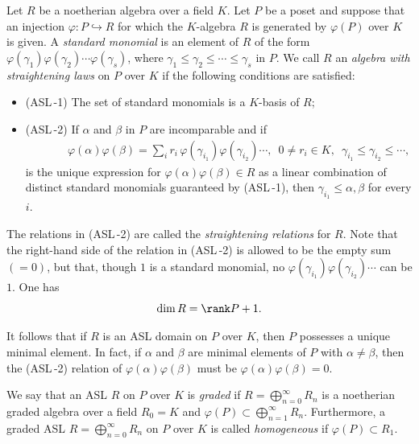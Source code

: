 \documentclass[12pt]{amsart}
\begin{document}
Let $R$ be a noetherian algebra over a field $K$.  Let $P$ be a poset and suppose that an injection $\varphi: P \hookrightarrow R$
for which the $K$-algebra $R$ is generated by $\varphi(P)$ over $K$ is given.  A {\em standard monomial} is an element of $R$ of the form $\varphi(\gamma_1) \varphi(\gamma_2)\cdots \varphi(\gamma_s)$, where $\gamma_1 \leq \gamma_2 \leq \cdots \leq \gamma_s$ in $P$.  We call $R$ an {\em algebra with straightening laws} \cite{Eis} on $P$ over $K$ if the following conditions are satisfied:
\begin{itemize}
\item[]
(ASL\,-1)
The set of standard monomials is a $K$-basis of $R$;
\item[]
(ASL\,-2)
If $\alpha$ and $\beta$ in $P$ are incomparable and if
\begin{eqnarray*}
\label{ASL}
\, \, \, \, \, \, \, \, \, \, \, \, \, \, \, \, \, \, \, \, 
\varphi(\alpha)\varphi(\beta) 
= \sum_{i} r_i\,\varphi(\gamma_{i_1})\varphi(\gamma_{i_2}) \cdots , \, \, \, 0 \neq r_i \in K, \, \, \, \gamma_{i_1}\leq \gamma_{i_2}\leq \cdots, 
\end{eqnarray*}
is the unique expression for $\varphi(\alpha)\varphi(\beta) \in R$ as a linear combination of distinct standard monomials guaranteed by (ASL\,-1), then $\gamma_{i_1} \leq \alpha, \beta$ for every $i$. 
\end{itemize}
The relations in (ASL\,-2) are called the {\em straightening relations} for $R$.  Note that the right-hand side of the relation in (ASL\,-2) is allowed to be the empty sum $(=0)$, but that, though $1$ is a standard monomial, no $\varphi(\gamma_{i_1})\varphi(\gamma_{i_2}) \cdots$ can be $1$.  One has 
\[
\dim R = \rank P + 1.
\]


It follows that if $R$ is an ASL domain on $P$ over $K$, then $P$ possesses a unique minimal element.  In fact, if $\alpha$ and $\beta$ are minimal elements of $P$ with $\alpha \neq \beta$, then the (ASL\,-2) relation of $\varphi(\alpha) \varphi(\beta)$ must be $\varphi(\alpha) \varphi(\beta) = 0$.

We say that an ASL $R$ on $P$ over $K$ is {\em graded} if $R = \bigoplus_{n=0}^{\infty} R_n$ is a noetherian graded algebra over a field $R_0=K$ and $\varphi(P) \subset \bigoplus_{n=1}^{\infty} R_n$.  Furthermore, a graded ASL $R = \bigoplus_{n=0}^{\infty} R_n$ on $P$ over $K$ is called {\em homogeneous} if $\varphi(P) \subset R_1$.
\end{document}
